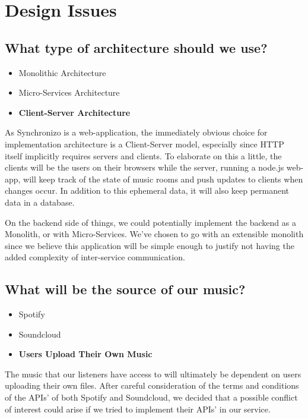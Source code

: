 \documentclass[12pt]{report}
\begin{document}
\chapter{Design Issues}

\section{What type of architecture should we use?}
\begin{itemize}
    \item{Monolithic Architecture}
    \item{Micro-Services Architecture}
    \item\textbf{Client-Server Architecture}
\end{itemize}
As Synchronizo is a web-application, the immediately obvious choice for implementation architecture is a Client-Server model, especially since HTTP itself implicitly requires servers and clients. To elaborate on this a little, the clients will be the users on their browsers while the server, running a node.js web-app, will keep track of the state of music rooms and push updates to clients when changes occur. In addition to this ephemeral data, it will also keep permanent data in a database.

On the backend side of things, we could potentially implement the backend as a Monolith, or with Micro-Services. We've chosen to go with an extensible monolith since we believe this application will be simple enough to justify not having the added complexity of inter-service communication.


\section{What will be the source of our music?}
\begin{itemize}
    \item{Spotify}
    \item{Soundcloud}
    \item\textbf{Users Upload Their Own Music}
\end{itemize}
The music that our listeners have access to will ultimately be dependent on users uploading their own files. After careful consideration of the terms and conditions of the APIs' of both Spotify and Soundcloud, we decided that a possible conflict of interest could arise if we tried to implement their APIs' in our service. 
\end{document}
